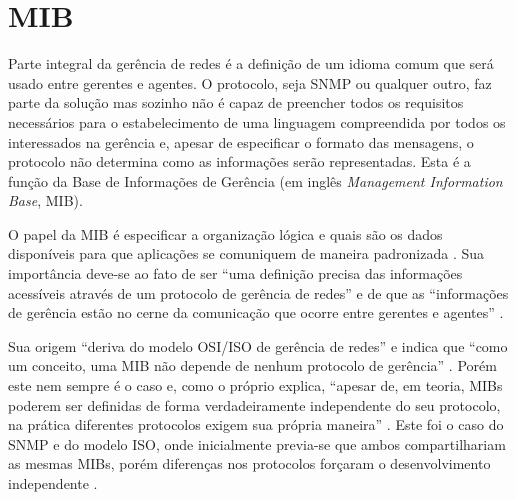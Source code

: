 \documentclass[twoside,english,brazilian]{UNISINOSmonografia}
\begin{document}
\section{MIB}

Parte integral da gerência de redes é a definição de um idioma comum que será 
usado entre gerentes e agentes. O protocolo, seja SNMP ou qualquer outro, faz 
parte da solução mas sozinho não é capaz de preencher todos os requisitos 
necessários para o estabelecimento de uma linguagem compreendida por todos os 
interessados na gerência e, apesar de especificar o formato das mensagens, o 
protocolo não determina como as informações serão representadas.
Esta é a função da Base de Informações de Gerência 
(em inglês \textit{Management Information Base}, MIB).

O papel da MIB é especificar a organização lógica e quais são os dados 
disponíveis para que aplicações se comuniquem de maneira padronizada 
\cite{Silva2005}.
Sua importância deve-se ao fato de ser 
``uma definição precisa das informações acessíveis através de um protocolo de 
gerência de redes''
\cite[p.~152]{Leinwand1996} 
e de que as
``informações de gerência estão no cerne da comunicação que ocorre entre 
gerentes e agentes''
\cite[p.~227]{Clemm2006}.

Sua origem ``deriva do modelo OSI/ISO de gerência de redes''
\cite[p.~46]{Ding2009} 
e indica que
``como um conceito, uma MIB não depende de nenhum protocolo de gerência''
\cite[p.~222]{Clemm2006}.
Porém este nem sempre é o caso e, como o próprio  
explica, 
``apesar de, em teoria, MIBs poderem ser definidas de forma verdadeiramente 
independente do seu protocolo, na prática diferentes protocolos exigem sua 
própria maneira''
.
Este foi o caso do SNMP e do modelo ISO, onde inicialmente previa-se que ambos 
compartilhariam as mesmas MIBs, porém diferenças nos protocolos forçaram o 
desenvolvimento independente \cite{Hunt1997,stallings1999snmp,Leinwand1996}.
\end{document}
